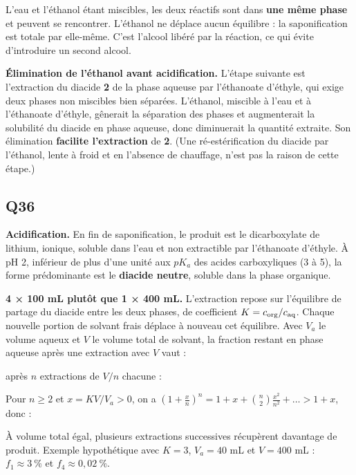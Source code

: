 \documentclass[11pt,a4paper]{article}
\newcommand{\equationajustee}[1]{%
  \sbox{\boiteequation}{$\displaystyle #1$}%
  \ifdim\wd\boiteequation>\linewidth
    \[\resizebox{\linewidth}{!}{\usebox{\boiteequation}}\]%
  \else
    \[#1\]%
  \fi}
\begin{document}
L'eau et l'éthanol étant miscibles, les deux réactifs sont dans \textbf{une même phase} et peuvent se rencontrer. L'éthanol ne déplace aucun équilibre : la saponification est totale par elle-même. C'est l'alcool libéré par la réaction, ce qui évite d'introduire un second alcool.

\textbf{Élimination de l'éthanol avant acidification.} L'étape suivante est l'extraction du diacide \textbf{2} de la phase aqueuse par l'éthanoate d'éthyle, qui exige deux phases non miscibles bien séparées. L'éthanol, miscible à l'eau et à l'éthanoate d'éthyle, gênerait la séparation des phases et augmenterait la solubilité du diacide en phase aqueuse, donc diminuerait la quantité extraite. Son élimination \textbf{facilite l'extraction} de \textbf{2}. (Une ré-estérification du diacide par l'éthanol, lente à froid et en l'absence de chauffage, n'est pas la raison de cette étape.)

\hypertarget{q36}{%
\subsection{Q36}\label{q36}}

\textbf{Acidification.} En fin de saponification, le produit est le dicarboxylate de lithium, ionique, soluble dans l'eau et non extractible par l'éthanoate d'éthyle. À pH 2, inférieur de plus d'une unité aux \(pK_a\) des acides carboxyliques (3 à 5), la forme prédominante est le \textbf{diacide neutre}, soluble dans la phase organique.

\textbf{4 × 100 mL plutôt que 1 × 400 mL.} L'extraction repose sur l'équilibre de partage du diacide entre les deux phases, de coefficient \(K=c_{\rm org}/c_{\rm aq}\). Chaque nouvelle portion de solvant frais déplace à nouveau cet équilibre. Avec \(V_a\) le volume aqueux et \(V\) le volume total de solvant, la fraction restant en phase aqueuse après une extraction avec \(V\) vaut :

\equationajustee{f_1=\frac{1}{1+KV/V_a};}

après \(n\) extractions de \(V/n\) chacune :

\equationajustee{f_n=\left(\frac{1}{1+KV/(nV_a)}\right)^n.}

Pour \(n\ge2\) et \(x=KV/V_a>0\), on a \(\left(1+\frac{x}{n}\right)^n=1+x+\binom n2\frac{x^2}{n^2}+\dots>1+x\), donc :

\equationajustee{\boxed{f_n<f_1}}

À volume total égal, plusieurs extractions successives récupèrent davantage de produit. Exemple hypothétique avec \(K=3\), \(V_a=40\) mL et \(V=400\) mL : \(f_1\approx3\ \%\) et \(f_4\approx0{,}02\ \%\).
\end{document}
